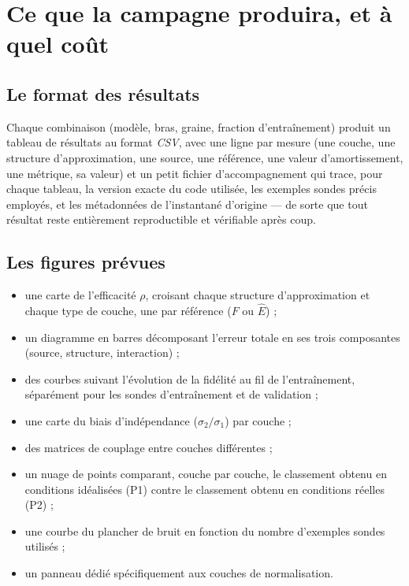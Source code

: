 \documentclass[11pt,a4paper]{article}
\newcommand{\eng}[1]{\emph{#1}}
\begin{document}
\section{Ce que la campagne produira, et à quel coût}

\subsection{Le format des résultats}

Chaque combinaison (modèle, bras, graine, fraction d'entraînement) produit un tableau de résultats
au format \eng{CSV}, avec une ligne par mesure (une couche, une structure d'approximation, une
source, une référence, une valeur d'amortissement, une métrique, sa valeur) et un petit fichier
d'accompagnement qui trace, pour chaque tableau, la version exacte du code utilisée, les exemples
sondes précis employés, et les métadonnées de l'instantané d'origine — de sorte que tout résultat
reste entièrement reproductible et vérifiable après coup.

\subsection{Les figures prévues}

\begin{itemize}
\item une carte de l'efficacité $\rho$, croisant chaque structure d'approximation et chaque type de
couche, une par référence ($F$ ou $\hat E$) ;
\item un diagramme en barres décomposant l'erreur totale en ses trois composantes (source,
structure, interaction) ;
\item des courbes suivant l'évolution de la fidélité au fil de l'entraînement, séparément pour les
sondes d'entraînement et de validation ;
\item une carte du biais d'indépendance ($\sigma_2/\sigma_1$) par couche ;
\item des matrices de couplage entre couches différentes ;
\item un nuage de points comparant, couche par couche, le classement obtenu en conditions idéalisées
(P1) contre le classement obtenu en conditions réelles (P2) ;
\item une courbe du plancher de bruit en fonction du nombre d'exemples sondes utilisés ;
\item un panneau dédié spécifiquement aux couches de normalisation.
\end{itemize}
\end{document}
